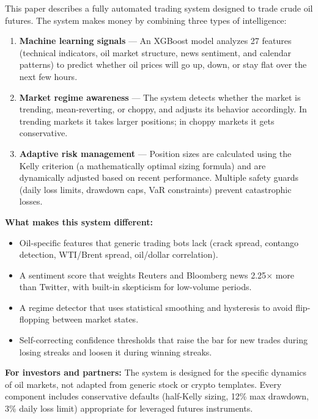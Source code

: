 \documentclass[12pt,a4paper]{article}
\begin{document}
This paper describes a fully automated trading system designed to trade crude oil futures. The system makes money by combining three types of intelligence:

\begin{enumerate}[leftmargin=*]
    \item \textbf{Machine learning signals} --- An XGBoost model analyzes 27 features (technical indicators, oil market structure, news sentiment, and calendar patterns) to predict whether oil prices will go up, down, or stay flat over the next few hours.

    \item \textbf{Market regime awareness} --- The system detects whether the market is trending, mean-reverting, or choppy, and adjusts its behavior accordingly. In trending markets it takes larger positions; in choppy markets it gets conservative.

    \item \textbf{Adaptive risk management} --- Position sizes are calculated using the Kelly criterion (a mathematically optimal sizing formula) and are dynamically adjusted based on recent performance. Multiple safety guards (daily loss limits, drawdown caps, VaR constraints) prevent catastrophic losses.
\end{enumerate}

\noindent\textbf{What makes this system different:}
\begin{itemize}[leftmargin=*]
    \item Oil-specific features that generic trading bots lack (crack spread, contango detection, WTI/Brent spread, oil/dollar correlation).
    \item A sentiment score that weights Reuters and Bloomberg news 2.25$\times$ more than Twitter, with built-in skepticism for low-volume periods.
    \item A regime detector that uses statistical smoothing and hysteresis to avoid flip-flopping between market states.
    \item Self-correcting confidence thresholds that raise the bar for new trades during losing streaks and loosen it during winning streaks.
\end{itemize}

\noindent\textbf{For investors and partners:} The system is designed for the specific dynamics of oil markets, not adapted from generic stock or crypto templates. Every component includes conservative defaults (half-Kelly sizing, 12\% max drawdown, 3\% daily loss limit) appropriate for leveraged futures instruments.
\end{document}
